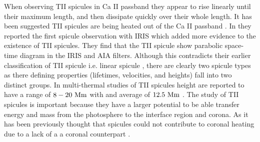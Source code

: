 \documentclass[12pt]{ociamthesis}
\begin{document}
%
When observing TII spicules in Ca II passband they appear to rise linearly until their maximum length, and then dissipate quickly over their whole length. It has been suggested TII spicules are being heated out of the Ca II passband \citep{Pontieu2007PASJ, Pereira2012, Skogsrud2015ApJ806170S, Chintzoglou2018ApJ85773C, Chintzoglou2021ApJ90682C}. In \cite{Pereira2014ApJ} they reported the first spicule observation with IRIS which added more evidence to the existence of TII spicules. They find that the TII spicule show parabolic space-time diagram in the IRIS and AIA filters. Although this contradicts their earlier classification of TII spicule i.e. linear spicule \citep{Pereira2012}, there are clearly two spicule types as there defining properties (lifetimes, velocities, and heights) fall into two distinct groups. In multi-thermal studies of TII spicules height are reported to have a range of $8-20~\rm{Mm}$ with and average of $12.5~\rm{Mm}$ \citep{Pereira2014ApJ, Skogsrud2015ApJ806170S}. The study of TII spicules is important because they have a larger potential to be able transfer energy and mass from the photosphere to the interface region and corona. As it has been previously thought that spicules could not contribute to coronal heating due to a lack of a a coronal counterpart \citep{Withbroe1983ApJ}.
\end{document}
